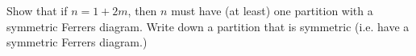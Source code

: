 Show that if $n = 1 + 2m$, then $n$ must have (at least) one partition
with a symmetric Ferrers diagram.
Write down a partition that is symmetric (i.e. have a symmetric
Ferrers diagram.)
